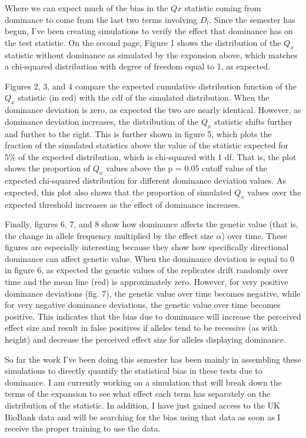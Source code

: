 \documentclass[a4paper,10pt]{article}
\begin{document}
Where we can expect much of the bias in the $Qx$ statistic coming from
dominance to come from the last two terms involving $D_l$. Since the
semester has begun, I've been creating simulations to verify the
effect that dominance has on the test statistic. On the second page,
Figure 1 shows the distribution of the $Q_x$ statistic without dominance as simulated by
the expansion above, which matches a chi-squared distribution with
degree of freedom equal to 1, as expected.

Figures 2, 3, and 4 compare the expected cumulative distribution
function of the $Q_x$ statistic (in red) with the cdf of the simulated
distribution. When the dominance deviation is zero, as expected the
two are nearly identical. However, as dominance deviation increases,
the distribution of the $Q_x$ statistic shifts further and further to
the right. This is further shown in figure 5, which plots the fraction
of the simulated statistics above the value of the statistic expected
for 5\% of the expected distribution, which is chi-squared with 1
df. That is, the plot shows the proportion of $Q_x$ values above the p = 0.05 cutoff value
of the expected chi-squared distribution for different dominance
deviation values. As expected, this plot also
shows that the proportion of simulated $Q_x$ values over the expected
threshold increases as the effect of dominance increases.

Finally, figures 6, 7, and 8 show how dominance affects the genetic
value (that is, the change in allele frequency multiplied by the effect size $\alpha$)
over time. These figures are especially interesting because they show
how specifically directional dominance can affect genetic value. When the
dominance deviation is equal to 0 in figure 6, as expected the genetic
values of the replicates drift randomly over time and the mean line
(red) is approximately zero. However, for very positive dominance
deviations (fig. 7), the genetic value over time becomes negative, while for
very negative dominance deviations, the genetic value over time
becomes positive. This indicates that the bias due to dominance will
increase the perceived effect size and result in false positives if alleles tend to be recessive 
(as with height) and decrease the perceived effect size for alleles
displaying dominance.

So far the work I've been doing this semester has been mainly in
assembling these simulations to directly quantify the statistical bias
in these tests due to dominance. I am currently working on a simulation that will break
down the terms of the expansion to see what effect each term has
separately on the distribution of the statistic. In addition, I have just gained access to the
UK BioBank data and will be searching for the bias using that data as
soon as I receive the proper training to use the data. 
\end{document}

